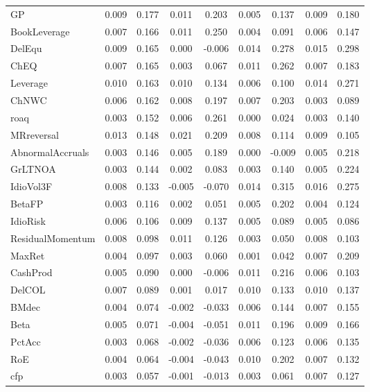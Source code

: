 \begin{table}[H]
\begin{tabular}{lcc|cc|cc|cc}
      GP & 0.009 & 0.177 & 0.011 & 0.203 & 0.005 & 0.137 & 0.009 & 0.180 \\ 
      BookLeverage & 0.007 & 0.166 & 0.011 & 0.250 & 0.004 & 0.091 & 0.006 & 0.147 \\ 
      DelEqu & 0.009 & 0.165 & 0.000 & -0.006 & 0.014 & 0.278 & 0.015 & 0.298 \\ 
      ChEQ & 0.007 & 0.165 & 0.003 & 0.067 & 0.011 & 0.262 & 0.007 & 0.183 \\ 
      Leverage & 0.010 & 0.163 & 0.010 & 0.134 & 0.006 & 0.100 & 0.014 & 0.271 \\ 
      ChNWC & 0.006 & 0.162 & 0.008 & 0.197 & 0.007 & 0.203 & 0.003 & 0.089 \\ 
      roaq & 0.003 & 0.152 & 0.006 & 0.261 & 0.000 & 0.024 & 0.003 & 0.140 \\ 
      MRreversal & 0.013 & 0.148 & 0.021 & 0.209 & 0.008 & 0.114 & 0.009 & 0.105 \\ 
      AbnormalAccruals & 0.003 & 0.146 & 0.005 & 0.189 & 0.000 & -0.009 & 0.005 & 0.218 \\ 
      GrLTNOA & 0.003 & 0.144 & 0.002 & 0.083 & 0.003 & 0.140 & 0.005 & 0.224 \\ 
      IdioVol3F & 0.008 & 0.133 & -0.005 & -0.070 & 0.014 & 0.315 & 0.016 & 0.275 \\ 
      BetaFP & 0.003 & 0.116 & 0.002 & 0.051 & 0.005 & 0.202 & 0.004 & 0.124 \\ 
      IdioRisk & 0.006 & 0.106 & 0.009 & 0.137 & 0.005 & 0.089 & 0.005 & 0.086 \\ 
      ResidualMomentum & 0.008 & 0.098 & 0.011 & 0.126 & 0.003 & 0.050 & 0.008 & 0.103 \\ 
      MaxRet & 0.004 & 0.097 & 0.003 & 0.060 & 0.001 & 0.042 & 0.007 & 0.209 \\ 
      CashProd & 0.005 & 0.090 & 0.000 & -0.006 & 0.011 & 0.216 & 0.006 & 0.103 \\ 
      DelCOL & 0.007 & 0.089 & 0.001 & 0.017 & 0.010 & 0.133 & 0.010 & 0.137 \\ 
      BMdec & 0.004 & 0.074 & -0.002 & -0.033 & 0.006 & 0.144 & 0.007 & 0.155 \\ 
      Beta & 0.005 & 0.071 & -0.004 & -0.051 & 0.011 & 0.196 & 0.009 & 0.166 \\ 
      PctAcc & 0.003 & 0.068 & -0.002 & -0.036 & 0.006 & 0.123 & 0.006 & 0.135 \\ 
      RoE & 0.004 & 0.064 & -0.004 & -0.043 & 0.010 & 0.202 & 0.007 & 0.132 \\ 
      cfp & 0.003 & 0.057 & -0.001 & -0.013 & 0.003 & 0.061 & 0.007 & 0.127 \\ 

\end{tabular}
\end{table}
